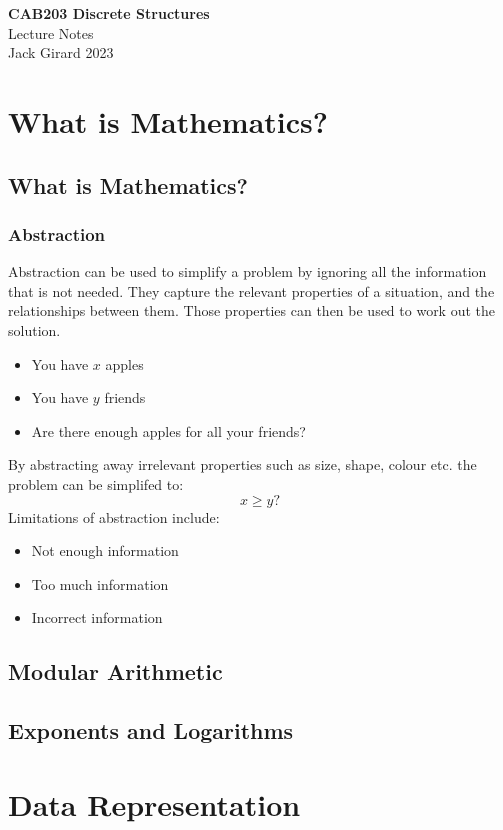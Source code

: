 \documentclass{article}
\begin{document}
\begin{titlepage}
    \begin{center}
        \LARGE{\textbf{CAB203 Discrete Structures}} \\[0.2in]
        \LARGE{Lecture Notes} \\[0.1in]
        \large{Jack Girard 2023}
    \end{center}
\end{titlepage}

\newpage

\tableofcontents
\newpage

\section{What is Mathematics?}
\subsection{What is Mathematics?}
\subsubsection{Abstraction}
Abstraction can be used to simplify a problem by ignoring all the information that is not needed.
They capture the relevant properties of a situation, and the relationships between them.
Those properties can then be used to work out the solution.
%
\begin{itemize}
    \item You have \(x\) apples
    \item You have \(y\) friends
    \item Are there enough apples for all your friends?
\end{itemize}
By abstracting away irrelevant properties such as size, shape, colour etc. the problem can be simplifed to:
\[x \geq y?\]
%
Limitations of abstraction include:
\begin{itemize}
    \item Not enough information
    \item Too much information
    \item Incorrect information
\end{itemize}
\subsection{Modular Arithmetic}
\subsection{Exponents and Logarithms}

\section{Data Representation}
\end{document}
